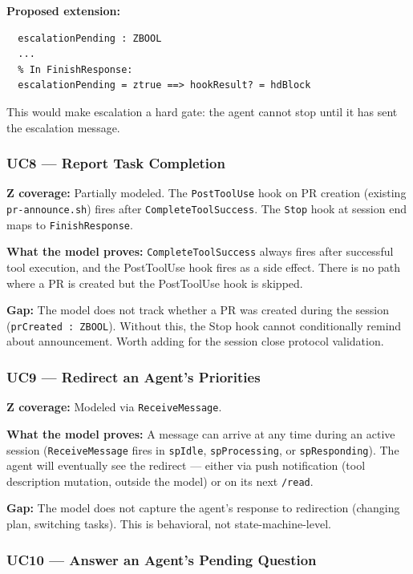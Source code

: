 \documentclass[a4paper,10pt,fleqn]{article}
\begin{document}
\textbf{Proposed extension:}

\begin{verbatim}
  escalationPending : ZBOOL
  ...
  % In FinishResponse:
  escalationPending = ztrue ==> hookResult? = hdBlock
\end{verbatim}

This would make escalation a hard gate: the agent cannot stop until it
has sent the escalation message.

\subsubsection{UC8 --- Report Task Completion}

\textbf{Z coverage:} Partially modeled. The \texttt{PostToolUse} hook
on PR creation (existing \texttt{pr-announce.sh}) fires after
\texttt{CompleteToolSuccess}. The \texttt{Stop} hook at session end
maps to \texttt{FinishResponse}.

\textbf{What the model proves:} \texttt{CompleteToolSuccess} always
fires after successful tool execution, and the PostToolUse hook fires
as a side effect. There is no path where a PR is created but the
PostToolUse hook is skipped.

\textbf{Gap:} The model does not track whether a PR was created during
the session (\texttt{prCreated : ZBOOL}). Without this, the Stop hook
cannot conditionally remind about announcement. Worth adding for the
session close protocol validation.

\subsubsection{UC9 --- Redirect an Agent's Priorities}

\textbf{Z coverage:} Modeled via \texttt{ReceiveMessage}.

\textbf{What the model proves:} A message can arrive at any time during
an active session (\texttt{ReceiveMessage} fires in \texttt{spIdle},
\texttt{spProcessing}, or \texttt{spResponding}). The agent will
eventually see the redirect --- either via push notification (tool
description mutation, outside the model) or on its next \texttt{/read}.

\textbf{Gap:} The model does not capture the agent's response to
redirection (changing plan, switching tasks). This is behavioral, not
state-machine-level.

\subsubsection{UC10 --- Answer an Agent's Pending Question}
\end{document}
